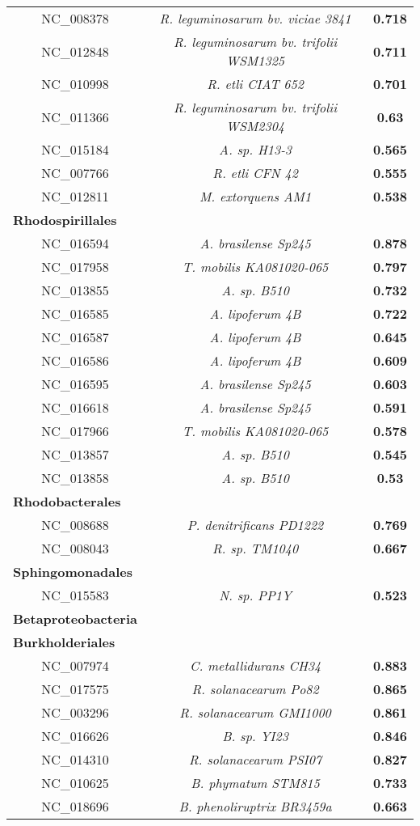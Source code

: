 \begin{landscape}
\begin{table}
\begin{minipage}[t]{0.4\textwidth}
\begin{tiny}
\begin{tabular}{c>{\itshape}c>{\bfseries}c}
NC\_008378&R. leguminosarum bv. viciae 3841&0.718\\
NC\_012848&R. leguminosarum bv. trifolii WSM1325&0.711\\
NC\_010998&R. etli CIAT 652&0.701\\
NC\_011366&R. leguminosarum bv. trifolii WSM2304&0.63\\
NC\_015184&A. sp. H13-3&0.565\\
NC\_007766&R. etli CFN 42&0.555\\
NC\_012811&M. extorquens AM1&0.538\\
\multicolumn{1}{l}{\textbf{Rhodospirillales}}\\
NC\_016594&A. brasilense Sp245&0.878\\
NC\_017958&T. mobilis KA081020-065&0.797\\
NC\_013855&A. sp. B510&0.732\\
NC\_016585&A. lipoferum 4B&0.722\\
NC\_016587&A. lipoferum 4B&0.645\\
NC\_016586&A. lipoferum 4B&0.609\\
NC\_016595&A. brasilense Sp245&0.603\\
NC\_016618&A. brasilense Sp245&0.591\\
NC\_017966&T. mobilis KA081020-065&0.578\\
NC\_013857&A. sp. B510&0.545\\
NC\_013858&A. sp. B510&0.53\\
\multicolumn{1}{l}{\textbf{Rhodobacterales}}\\
NC\_008688&P. denitrificans PD1222&0.769\\
NC\_008043&R. sp. TM1040&0.667\\
\multicolumn{1}{l}{\textbf{Sphingomonadales}}\\
NC\_015583&N. sp. PP1Y&0.523\\
\multicolumn{1}{l}{\textbf{Betaproteobacteria}}\\
\hline
\multicolumn{1}{l}{\textbf{Burkholderiales}}\\
NC\_007974&C. metallidurans CH34&0.883\\
NC\_017575&R. solanacearum Po82&0.865\\
NC\_003296&R. solanacearum GMI1000&0.861\\
NC\_016626&B. sp. YI23&0.846\\
NC\_014310&R. solanacearum PSI07&0.827\\
NC\_010625&B. phymatum STM815&0.733\\
NC\_018696&B. phenoliruptrix BR3459a&0.663\\

\end{tabular}
\end{tiny}
\end{minipage}
\end{table}
\end{landscape}

